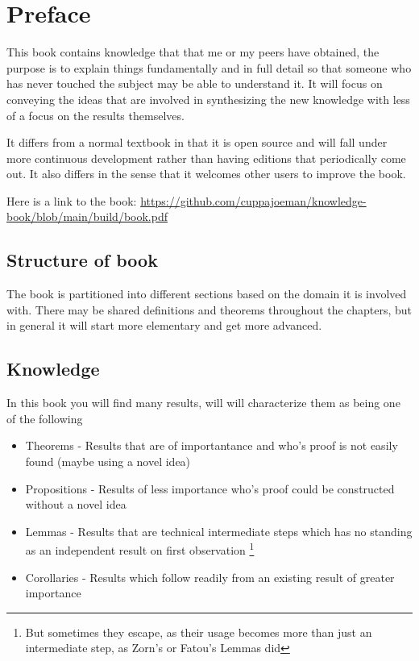 \chapter*{Preface}
This book contains knowledge that that me or my peers have obtained, the purpose is to explain things fundamentally and in full detail so that someone who has never touched the subject may be able to understand it. It will focus on conveying the ideas that are involved in synthesizing the new knowledge with less of a focus on the results themselves.

It differs from a normal textbook in that it is open source and will fall under more continuous development rather than having editions that periodically come out. It also differs in the sense that it welcomes other users to improve the book.

Here is a link to the book: \url{https://github.com/cuppajoeman/knowledge-book/blob/main/build/book.pdf}


\section*{Structure of book}
The book is partitioned into different sections based on the domain it is involved with. There may be shared definitions and theorems throughout the chapters, but in general it will start more elementary and get more advanced.

\section*{Knowledge}
In this book you will find many results, will will characterize them as being one of the following
\begin{itemize}
    \item Theorems - Results that are of importantance and who's proof is not easily found (maybe using a novel idea)
  \item Propositions - Results of less importance who's proof could be constructed without a novel idea
  \item Lemmas - Results that are technical intermediate steps which has no standing as an independent result on first observation \footnote{But sometimes they escape, as their usage becomes more than just an intermediate step,  as Zorn's or Fatou's Lemmas did}
    \item Corollaries - Results which follow readily  from an existing result of greater importance
\end{itemize}

